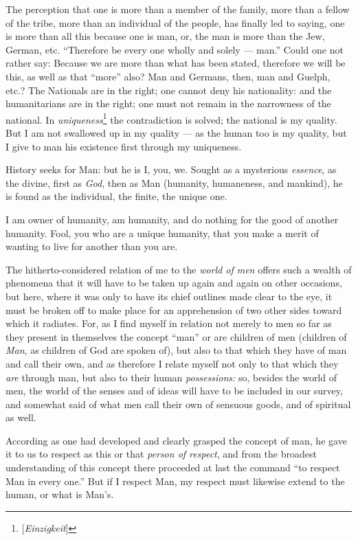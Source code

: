 The perception that one is more than a member of the family, more than a 
fellow of the tribe, more than an individual of the people, has finally led to 
saying, one is more than all this because one is man, or, the man is more than 
the Jew, German, etc. ``Therefore be every one wholly and solely --- man.'' 
Could one not rather say: Because we are more than what has been stated, 
therefore we will be this, as well as that ``more'' also? Man and Germans, 
then, man and Guelph, etc.? The Nationals are in the right; one cannot deny 
his nationality: and the humanitarians are in the right; one must not remain 
in the narrowness of the national. In 
\textit{uniqueness}\footnote{[\textit{Einzigkeit}]} the contradiction is 
solved; the national is my quality. But I am not swallowed up in my quality --- as the human too is my quality, but I give to man his existence first through 
my uniqueness.

History seeks for Man: but he is I, you, we. Sought as a mysterious 
\textit{essence}, as the divine, first as \textit{God}, then as Man (humanity, 
humaneness, and mankind), he is found as the individual, the finite, the 
unique one.

I am owner of humanity, am humanity, and do nothing for the good of another 
humanity. Fool, you who are a unique humanity, that you make a merit of 
wanting to live for another than you are.

The hitherto-considered relation of me to the \textit{world of men} offers 
such a wealth of phenomena that it will have to be taken up again and again on 
other occasions, but here, where it was only to have its chief outlines made 
clear to the eye, it must be broken off to make place for an apprehension of 
two other sides toward which it radiates. For, as I find myself in relation 
not merely to men so far as they present in themselves the concept ``man'' 
or are children of men (children of \textit{Man}, as children of God are 
spoken of), but also to that which they have of man and call their own, and as 
therefore I relate myself not only to that which they \textit{are} through 
man, but also to their human \textit{possessions:} so, besides the world of 
men, the world of the senses and of ideas will have to be included in our 
survey, and somewhat said of what men call their own of sensuous goods, and of 
spiritual as well.

According as one had developed and clearly grasped the concept of man, he gave 
it to us to respect as this or that \textit{person of respect}, and from the 
broadest understanding of this concept there proceeded at last the command 
``to respect Man in every one.'' But if I respect Man, my respect must 
likewise extend to the human, or what is Man's.

